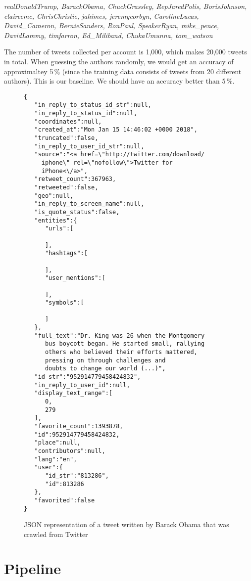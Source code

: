 \documentclass[journal, a4paper]{IEEEtran}
\begin{document}
\footnotesize
\textit{
realDonaldTrump, BarackObama, ChuckGrassley, RepJaredPolis, BorisJohnson, clairecmc, ChrisChristie, jahimes, jeremycorbyn, CarolineLucas, David\_Cameron, BernieSanders, RonPaul, SpeakerRyan, mike\_pence, DavidLammy, timfarron, Ed\_Miliband, ChukaUmunna, tom\_watson
}
\normalsize

The number of tweets collected per account is 1,000, which makes 20,000 tweets in total. When guessing the authors randomly, we would get an accuracy of approximaltey 5\,\% (since the training data consists of tweets from 20 different authors). This is our baseline. We should have an accuracy better than 5\,\%.

\begin{figure}
\caption{JSON representation of a tweet written by Barack Obama that was crawled from Twitter}
\footnotesize
\begin{verbatim}
{  
   "in_reply_to_status_id_str":null,
   "in_reply_to_status_id":null,
   "coordinates":null,
   "created_at":"Mon Jan 15 14:46:02 +0000 2018",
   "truncated":false,
   "in_reply_to_user_id_str":null,
   "source":"<a href=\"http://twitter.com/download/
     iphone\" rel=\"nofollow\">Twitter for
     iPhone<\/a>",
   "retweet_count":367963,
   "retweeted":false,
   "geo":null,
   "in_reply_to_screen_name":null,
   "is_quote_status":false,
   "entities":{  
      "urls":[  

      ],
      "hashtags":[  

      ],
      "user_mentions":[  

      ],
      "symbols":[  

      ]
   },
   "full_text":"Dr. King was 26 when the Montgomery
      bus boycott began. He started small, rallying
      others who believed their efforts mattered,
      pressing on through challenges and
      doubts to change our world (...)",
   "id_str":"952914779458424832",
   "in_reply_to_user_id":null,
   "display_text_range":[  
      0,
      279
   ],
   "favorite_count":1393878,
   "id":952914779458424832,
   "place":null,
   "contributors":null,
   "lang":"en",
   "user":{  
      "id_str":"813286",
      "id":813286
   },
   "favorited":false
}
\end{verbatim}
\normalsize
\end{figure}

\section{Pipeline}
\label{sec:pipeline}
\end{document}

